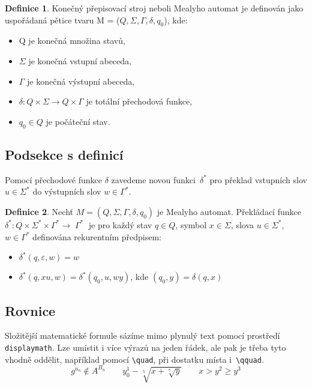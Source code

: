 \documentclass[a4paper, 11pt, twocolumn]{article}
\theoremstyle{definition}
\newtheorem{definition}{Definice}
\begin{document}
    \begin{definition}
        \label{definition_1}
		Konečný přepisovací stroj neboli Mea\-lyho automat je definován jako uspořádaná pětice
    tvaru M = (\(Q, \Sigma, \Gamma, \delta, q_0\)), kde:
    \begin{itemize}
        \item Q je konečná množina stavů,
        \item $\Sigma$ je konečná vstupní abeceda,
        \item $\Gamma$ je konečná výstupní abeceda,
        \item $\delta : Q \times \Sigma \rightarrow Q \times \Gamma$ je totální přechodová funkce,
        \item $q_0 \in Q$ je počáteční stav.
    \end{itemize}
	\end{definition}

    \subsection{Podsekce s definicí}
    
    Pomocí přechodové funkce \(\delta\) zavedeme novou funkci~\(\delta^*\)
    pro překlad vstupních slov \(u \in \Sigma^*\) do výstupních slov
    \(w \in \Gamma^*\).

    \begin{definition}
		\label{definition_matematika}
        Nechť $M = (Q, \Sigma, \Gamma, \delta, q_0)$ je Mealyho automat. Překládací funkce $\delta^* : Q \times \Sigma^* \times \Gamma^* \rightarrow\; \Gamma^*\;$ je pro každý stav $q \in Q$, symbol $x \in \Sigma$, slova $u \in \Sigma^*$, \( w \in \Gamma^* \) definována rekurentním předpisem:
    \begin{itemize}
        \item $\delta^*(q, \varepsilon, w) = w$
        \item $\delta^*(q, xu, w) = \delta^*(q_0, u, wy)$, kde $(q_0, y) = \delta(q, x)$
    \end{itemize}
	\end{definition}

    \subsection{Rovnice}

    Složitější matematické formule sázíme mimo plynulý
    text pomocí prostředí \verb|displaymath|. Lze umístit i více
    výrazů na jeden řádek, ale pak je třeba tyto vhodně
    oddělit, například pomocí \verb|\quad|, při dostatku místa
    i~\verb|\qquad|.
    $$
		g^{a_n} \notin A^{B_n}
		\qquad
		y_0^1 - \sqrt[5]{x+\sqrt[7]{y}}
		\qquad
		x > y^2 \geq y^3
	$$
\end{document}
